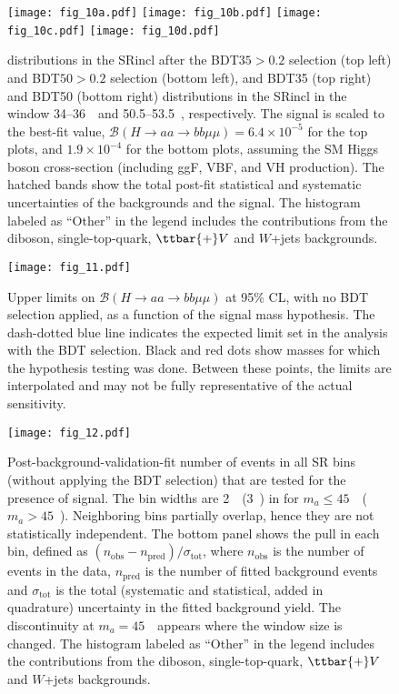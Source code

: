 \documentclass[cernpreprint, backref=false, texlive=2020, UKenglish, dvipsnames, block=none, texmf]{atlasdoc}
\begin{document}
\begin{figure}
\centering
\texttt{[image: fig\_10a.pdf]}
\texttt{[image: fig\_10b.pdf]}
\texttt{[image: fig\_10c.pdf]}
\texttt{[image: fig\_10d.pdf]}
\caption{\Mmm distributions in the SRincl after the BDT$35>0.2$ selection (top left) and BDT$50>0.2$ selection (bottom left), and BDT35 (top right) and BDT50 (bottom right) distributions in the SRincl in the \Mmm window 34--36~\GeV\ and 50.5--53.5~\GeV, respectively.
The signal is scaled to the best-fit value, $\mathcal{B}(H \rightarrow aa \rightarrow bb\mu\mu)=6.4\times 10^{-5}$ for the top plots, and $1.9\times 10^{-4}$ for the bottom plots, assuming the SM Higgs boson cross-section (including ggF, VBF, and VH production). The hatched bands show the total post-fit statistical and systematic uncertainties of the backgrounds and the signal. The histogram labeled as ``Other'' in the legend includes the contributions from the diboson, single-top-quark, $\ttbar{+}V$ and $W$+jets backgrounds.}
\label{SRwithSign1}
\end{figure}
 
 
\begin{figure}
\centering
\texttt{[image: fig\_11.pdf]}
\caption{Upper limits on $\mathcal{B}(H \rightarrow aa \rightarrow bb\mu\mu)$  at 95\% CL, with no BDT selection applied, as a function of the signal mass hypothesis. The dash-dotted blue line indicates the expected limit set in the analysis with the BDT selection. Black and red dots show masses for which the hypothesis testing was done. Between these points, the limits are interpolated and may not be fully representative of the actual sensitivity. }
\label{Limits_noBDT}
\end{figure}
 
 
\begin{figure}
\centering
\texttt{[image: fig\_12.pdf]}
\caption{Post-background-validation-fit number of  events in all SR bins (without applying the BDT selection) that are tested for the presence of signal. The bin widths are 2~\GeV\ (3~\GeV) in \Mmm for $m_a\leq45$~\GeV\ ($m_a>45$~\GeV). Neighboring bins partially overlap, hence they are not statistically independent.
The bottom panel shows the pull in each bin, defined as $(n_\mathrm{obs}-n_\mathrm{pred})/\sigma_\mathrm{tot}$, where $n_\mathrm{obs}$ is the number of events in the data, $n_\mathrm{pred}$ is the number of fitted background events and $\sigma_\mathrm{tot}$ is the total (systematic and statistical, added in quadrature) uncertainty in the fitted background yield. The discontinuity at $m_a=45$~\GeV\ appears where the \Mmm window size is changed. The histogram labeled as ``Other'' in the legend includes the contributions from the diboson, single-top-quark, $\ttbar{+}V$ and $W$+jets backgrounds.}
\label{SRpullsnoBDT}
\end{figure}
 
\end{document}
